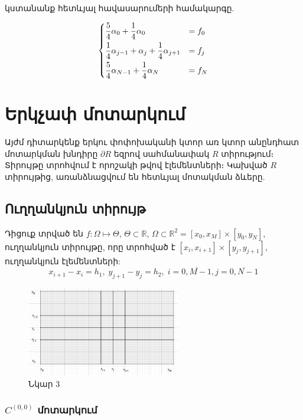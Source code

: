 \documentclass[fleqn, bachelor,subf,12pt,notitlepage]{disser}
\begin{document}
կստանանք հետևյալ հավասարումերի համակարգը.
 
$$\begin{dcases}
\frac{5}{4}\alpha_{0} + \frac{1}{4}\alpha_{0} &= f_{0}\\
\frac{1}{4}\alpha_{j-1} + \alpha_{j} + \frac{1}{4}\alpha_{j+1} &= f_{j}\\
\frac{5}{4}\alpha_{N-1} + \frac{1}{4}\alpha_{N} &= f_{N}\\
\end{dcases}$$
\newpage
\section*{Երկչափ մոտարկում}

Այժմ դիտարկենք երկու փոփոխականի կտոր առ կտոր անընդհատ մոտարկման խնդիրը $\partial R$ եզրով սահմանափակ $R$ տիրությում։ Տիրույթը տրոհվում է որոշակի թվով էլեմենտների։ Կախված $R$ տիրույթից, առանձնացվում են հետևյալ մոտակման ձևերը.

\subsection*{Ուղղանկյուն տիրույթ}

Դիցուք տրված են $f:\Omega\mapsto \Theta$,  $\Theta \subset \mathbb{R}$, $\Omega \subset \mathbb{R}^{2} = \left[x_{0}, x_{M}\right] \times \left[y_{0}, y_{N}\right]$,  ուղղանկյուն տիրույթը, որը տրոհված է $\left[x_{i}, x_{i+1}\right] \times \left[y_{j}, y_{j+1}\right]$, ուղղանկյուն էլեմենտների:
$$x_{i+1}-x_{i}=h_{1}, \; y_{j+1}-y_{j}=h_{2}, \; i=\overline{0, M-1}, j=\overline{0, N-1}$$

\begin{figure}[h!]
\centering
\includegraphics[width=0.6\textwidth]{images/two_var_linear}
\captionsetup{labelformat=empty}
\caption{\hfill Նկար 3}
\end{figure}

\subsubsection*{$C^{(0,0)}$ մոտարկում}
\end{document}
